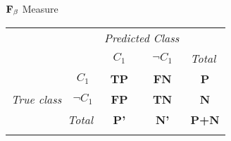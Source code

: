 \begin{frame}{$\text{\textbf{F}}_\beta$ Measure}

	\vspace*{-1.5em}

	\begin{center}
		\begin{tabular}{lp{1cm}p{1cm}p{1cm}p{1cm}}
			                                                           &                                                                & \multicolumn{2}{c}{\textit{Predicted Class}}              & \multicolumn{1}{l}{}                                                                                \\ \cline{3-4}
			                                                           & \multicolumn{1}{l|}{}                                          & \multicolumn{1}{c|}{\cellcolor{faugray!62}\textbf{$C_1$}} & \multicolumn{1}{c|}{\cellcolor{faugray!62}\textbf{$\neg C_1$}} & \multicolumn{1}{l}{\textit{Total}} \\ \cline{2-5}
			\multicolumn{1}{c|}{}                                      & \multicolumn{1}{c|}{\cellcolor{faugray!62}\textbf{$C_1$}}      & \multicolumn{1}{c|}{\textbf{TP}}                          & \multicolumn{1}{c|}{\textbf{FN}}                               & \multicolumn{1}{c}{\textbf{P}}     \\ \cline{2-4}
			\multicolumn{1}{c|}{\multirow{-2}{*}{\textit{True class}}} & \multicolumn{1}{c|}{\cellcolor{faugray!62}\textbf{$\neg C_1$}} & \multicolumn{1}{c|}{\textbf{FP}}                          & \multicolumn{1}{c|}{\textbf{TN}}                               & \multicolumn{1}{c}{\textbf{N}}     \\ \cline{2-5}
			\multicolumn{2}{r|}{\textit{Total}}                        & \multicolumn{1}{c}{\textbf{P'}}                                & \multicolumn{1}{c|}{\textbf{N'}}                          & \multicolumn{1}{c}{\textbf{P+N}}                                                                    \\
			                                                           &                                                                &                                                           &                                                                &
		\end{tabular}
	\end{center}

	\vspace*{-0.5cm}


\end{frame}
